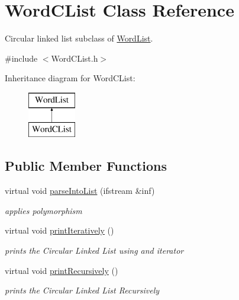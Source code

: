 \hypertarget{classWordCList}{\section{Word\-C\-List Class Reference}
\label{classWordCList}
}


Circular linked list subclass of \hyperlink{classWordList}{Word\-List}.  




{\ttfamily \#include $<$Word\-C\-List.\-h$>$}

Inheritance diagram for Word\-C\-List\-:\begin{figure}[H]
\begin{center}
\leavevmode
\includegraphics[height=2.000000cm]{classWordCList}
\end{center}
\end{figure}
\subsection*{Public Member Functions}
\begin{DoxyCompactItemize}
\item 
virtual void \hyperlink{classWordCList_a45ba8475164d5f5c21d9aa36183f278b}{parse\-Into\-List} (ifstream \&inf)
\begin{DoxyCompactList}\small\item\em applies polymorphism \end{DoxyCompactList}\item 
\hypertarget{classWordCList_a5aba6fc77dde7ff41f4bf4c75ba00b2c}{virtual void \hyperlink{classWordCList_a5aba6fc77dde7ff41f4bf4c75ba00b2c}{print\-Iteratively} ()}\label{classWordCList_a5aba6fc77dde7ff41f4bf4c75ba00b2c}

\begin{DoxyCompactList}\small\item\em prints the Circular Linked List using and iterator \end{DoxyCompactList}\item 
\hypertarget{classWordCList_ad4fc445b5b33b527a44e7a1245b75f8f}{virtual void \hyperlink{classWordCList_ad4fc445b5b33b527a44e7a1245b75f8f}{print\-Recursively} ()}\label{classWordCList_ad4fc445b5b33b527a44e7a1245b75f8f}

\begin{DoxyCompactList}\small\item\em prints the Circular Linked List Recursively \end{DoxyCompactList}\end{DoxyCompactItemize}



